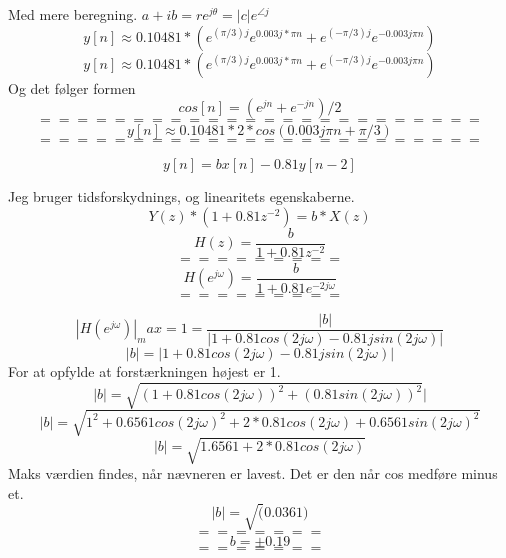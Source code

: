 \begin{Opgaver}
\begin{kapitel}
\begin{Opgave}
\begin{UnderOpgave}[\text{Determine analytically the response $y[n]$ to the input $x[n] = 2 cos(0.52n + 60°)$.}]
                Med mere beregning. $a + ib = re^{j\theta} = |c|e^{\angle j}$
                \[y[n] \approx 0.10481 *(e^{(\pi/3)j}e^{0.003j*\pi n} + e^{(-\pi/3)j}e^{-0.003j\pi n})\]
                \[y[n] \approx 0.10481 *(e^{(\pi/3)j}e^{0.003j*\pi n} + e^{(-\pi/3)j}e^{-0.003j\pi n})\]
                Og det følger formen 
                \[cos[n] = (e^{jn} + e^{-jn})/2\]
                \[========================\]
                \[y[n] \approx 0.10481 * 2 * cos(0.003j\pi n + \pi/3)\]
                \[========================\]
            \end{UnderOpgave}
            \begin{UnderOpgave}
            \end{UnderOpgave}
        \end{Opgave}
        \begin{Opgave}
            \[y[n] = bx[n] - 0.81y[n - 2]\]
            \begin{UnderOpgave}
                Jeg bruger tidsforskydnings, og linearitets egenskaberne.
                \[Y(z) * (1 + 0.81z^{-2}) = b*X(z)\]
                \[H(z) = \frac{b}{1 + 0.81z^{-2}}\]
                \[=========\]
                \[H(e^{j\omega}) = \frac{b}{1 + 0.81e^{-2j\omega}}\]
                \[=========\]
            \end{UnderOpgave}

            \begin{UnderOpgave}[Determine b so that $|H(e^{j\omega})|_{max} = 1$. Plot the resulting magnitude response.]
                \[|H(e^{j\omega})|_max = 1 = \frac{|b|}{|1 + 0.81cos(2j\omega) - 0.81jsin(2j\omega)|}\]
                \[|b| = |1 + 0.81cos(2j\omega) - 0.81jsin(2j\omega)|\] 
                For at opfylde at forstærkningen højest er 1.
                \[|b| = \sqrt{(1 + 0.81cos(2j\omega))^2 + (0.81sin(2j\omega))^2}|\] 
                \[|b| = \sqrt{1^2 + 0.6561cos(2j\omega)^2 + 2*0.81cos(2j\omega) + 0.6561sin(2j\omega)^2}\]
                \[|b| = \sqrt{1.6561 + 2*0.81cos(2j\omega)}\]
                Maks værdien findes, når nævneren er lavest. Det er den når cos medføre minus et. 
                \[|b| = \sqrt(0.0361)\]
                \[=======\]
                \[b = \pm 0.19\]
                \[=======\]


\end{UnderOpgave}
\end{Opgave}
\end{kapitel}
\end{Opgaver}
